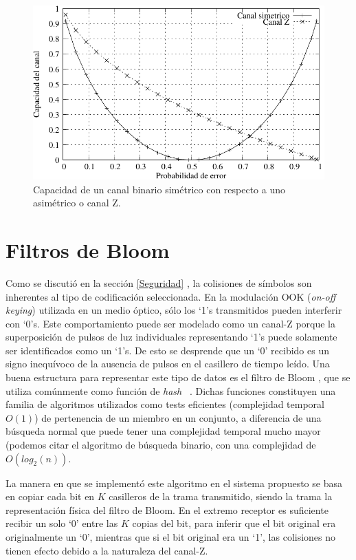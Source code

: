 \begin{figure}[th]
  \begin{center}
    \includegraphics[scale=1.1]{graphs/grafico_comparacion_capacidad_binaria_z}
  \end{center}
  \caption{Capacidad de un canal binario simétrico con respecto a uno asimétrico o canal Z.}
  \label{fig:CompBZ}
\end{figure}


\section{Filtros de Bloom}
\label{Bloomf}
Como se discutió en la sección \ref{Seguridad} , la colisiones de símbolos son inherentes al tipo de codificación seleccionada.
En la modulación OOK (\textit{on-off keying}) utilizada en un medio óptico, sólo los ‘1’s transmitidos pueden interferir con ‘0’s. Este comportamiento puede ser modelado como un canal-Z porque la superposición de pulsos de luz individuales representando ‘1’s puede solamente ser identificados como un ‘1’s. De esto se desprende que un ‘0’ recibido es un signo inequívoco de la ausencia de pulsos en el casillero de tiempo leído.
Una buena estructura para representar este tipo de datos es el filtro de Bloom \cite{Bloom70space/timetrade-offs}, que se utiliza comúnmente como función de \textit{hash}~ \cite{song2005fast}. Dichas funciones constituyen una familia de algoritmos utilizados como tests eficientes (complejidad temporal $O(1)$) de pertenencia de un miembro en un conjunto, a diferencia de una búsqueda normal que puede tener una complejidad temporal mucho mayor (podemos citar el algoritmo de búsqueda binario, con una complejidad de $O(log_2(n))$.

La manera en que se implementó este algoritmo en el sistema propuesto se basa en copiar cada bit en $K$ casilleros de la trama transmitido, siendo la trama la representación física del filtro de Bloom.
En el extremo receptor es suficiente recibir un solo ‘0’ entre las $K$ copias del bit, para inferir que el bit original era originalmente un ‘0’, mientras que si el bit original era un ‘1’, las colisiones no tienen efecto debido a la naturaleza del canal-Z.

